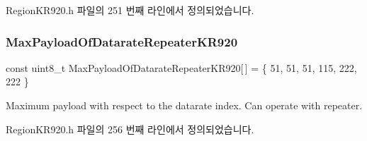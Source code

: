 Region\+K\+R920.\+h 파일의 251 번째 라인에서 정의되었습니다.

\mbox{\label{group___r_e_g_i_o_n_k_r920_ga57cb41db0862ca11e76201e87843f2e0}} 
\subsubsection{\texorpdfstring{Max\+Payload\+Of\+Datarate\+Repeater\+K\+R920}{MaxPayloadOfDatarateRepeaterKR920}}
{\footnotesize\ttfamily const uint8\+\_\+t Max\+Payload\+Of\+Datarate\+Repeater\+K\+R920\mbox{[}$\,$\mbox{]} = \{ 51, 51, 51, 115, 222, 222 \}\hspace{0.3cm}{\ttfamily [static]}}

Maximum payload with respect to the datarate index. Can operate with repeater. 

Region\+K\+R920.\+h 파일의 256 번째 라인에서 정의되었습니다.

